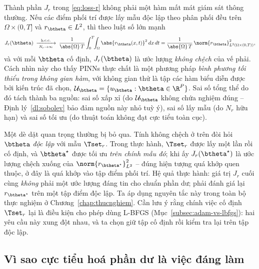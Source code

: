 \begin{nhanxet}
\label{rem:monte-carlo}
Thành phần $J_{r}$ trong \eqref{eq:loss-r} không phải một hàm mất mát giám sát
thông thường. Nếu các điểm phối trí được lấy mẫu độc lập theo phân phối đều trên
$\Omega \times (0,T]$ và $r_{\btheta} \in L^2$, thì theo luật số lớn mạnh
\begin{equation}
J_{r}(\btheta)
\;\xrightarrow[\;N_{r} \to \infty\;]{\text{h.c.c.}}\;
\frac{1}{\abs{\Omega}\,T}
\int_{0}^{T}\!\!\int_{\Omega}
\abs{r_{\btheta}(x,t)}^{2}\, dx\, dt
= \frac{1}{\abs{\Omega}\,T}\,
\norm{r_{\btheta}}_{L^{2}(\Omega \times (0,T))}^{2},
\label{eq:mc-estimate}
\end{equation}
và với mỗi $\btheta$ cố định, $J_r(\btheta)$ là ước lượng \emph{không chệch} của
vế phải. Cách nhìn này cho thấy PINNs thực chất là một phương pháp \emph{bình
phương tối thiểu trong không gian hàm}, với không gian thử là tập các hàm biểu
diễn được bởi kiến trúc đã chọn,
$\mathcal{U}_{\btheta} = \{u_{\btheta} : \btheta \in \R^{P}\}$. Sai số tổng thể
do đó tách thành ba nguồn: sai số xấp xỉ (do $\mathcal{U}_{\btheta}$ không chứa
nghiệm đúng -- Định lý~\ref{dl:sobolev} bảo đảm nguồn này nhỏ tuỳ ý), sai số lấy
mẫu (do $N_{r}$ hữu hạn) và sai số tối ưu (do thuật toán không đạt cực tiểu toàn
cục).
 
Một dè dặt quan trọng thường bị bỏ qua. Tính không chệch ở trên đòi hỏi $\btheta$
\emph{độc lập} với mẫu $\Tset_r$. Trong thực hành, $\Tset_r$ được lấy một lần rồi
cố định, và $\btheta^{\star}$ được tối ưu \emph{trên chính mẫu đó}; khi ấy
$J_r(\btheta^{\star})$ là ước lượng chệch xuống của
$\norm{r_{\btheta^\star}}^2_{L^2}$ -- đúng hiện tượng quá khớp quen thuộc, ở đây
là quá khớp vào tập điểm phối trí. Hệ quả thực hành: giá trị $J_r$ cuối cùng
\emph{không} phải một ước lượng đáng tin cho chuẩn phần dư; phải đánh giá lại
$r_{\btheta^\star}$ trên một tập điểm độc lập. Ta áp dụng nguyên tắc này trong
toàn bộ thực nghiệm ở Chương~\ref{chap:thucnghiem}. Cần lưu ý rằng chính việc cố
định $\Tset_r$ lại là điều kiện cho phép dùng L-BFGS
(Mục~\ref{subsec:adam-vs-lbfgs}): hai yêu cầu này xung đột nhau, và ta chọn giữ
tập cố định rồi kiểm tra lại trên tập độc lập.
\end{nhanxet}
 
\subsection{Vì sao cực tiểu hoá phần dư là việc đáng làm}
\label{subsec:chan-on-dinh}
 
